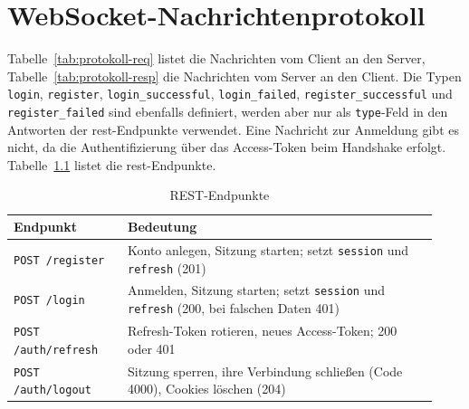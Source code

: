 \chapter{WebSocket-Nachrichtenprotokoll}
\label{anh:protokoll}

Tabelle~\ref{tab:protokoll-req} listet die Nachrichten vom Client an den Server, Tabelle~\ref{tab:protokoll-resp} die Nachrichten vom Server an den Client. Die Typen \texttt{login}, \texttt{register}, \texttt{login\_successful}, \texttt{login\_failed}, \texttt{register\_successful} und \texttt{register\_failed} sind ebenfalls definiert, werden aber nur als \texttt{type}-Feld in den Antworten der \gls{rest}-Endpunkte verwendet. Eine Nachricht zur Anmeldung gibt es nicht, da die Authentifizierung über das Access-Token beim Handshake erfolgt. Tabelle~\ref{tab:rest} listet die \gls{rest}-Endpunkte.

{\sffamily\footnotesize
\begin{longtable}{p{0.25\linewidth}p{0.68\linewidth}}
  \caption{REST-Endpunkte}\label{tab:rest}\\
  \toprule
  \textbf{Endpunkt} & \textbf{Bedeutung} \\
  \midrule
  \texttt{POST /register} & Konto anlegen, Sitzung starten; setzt \texttt{session} und \texttt{refresh} (201) \\
  \texttt{POST /login} & Anmelden, Sitzung starten; setzt \texttt{session} und \texttt{refresh} (200, bei falschen Daten 401) \\
  \texttt{POST /auth/refresh} & Refresh-Token rotieren, neues Access-Token; 200 oder 401 \\
  \texttt{POST /auth/logout} & Sitzung sperren, ihre Verbindung schließen (Code 4000), Cookies löschen (204) \\
  \bottomrule
\end{longtable}
}

